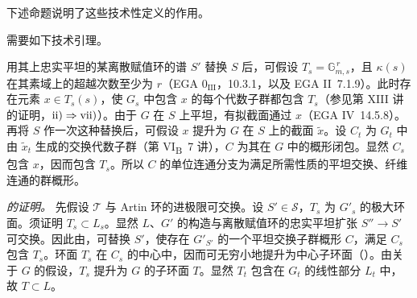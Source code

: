 下述命题说明了这些技术性定义的作用。


需要如下技术引理。


用其上忠实平坦的某离散赋值环的谱 \(S'\) 替换 \(S\) 后，可假设 \(T_s=\mathbb G_{m,s}^{\,r}\)，且 \(\kappa(s)\) 在其素域上的超越次数至少为 \(r\)（EGA \(0_{\mathrm{III}}\)，10.3.1，以及 EGA II~7.1.9）。此时存在元素 \(x\in T_s(s)\)，使 \(G_s\) 中包含 \(x\) 的每个代数子群都包含 \(T_s\)（参见第 XIII 讲  的证明，\(\textup{ii)}\Rightarrow\textup{vii)}\)）。由于 \(G\) 在 \(S\) 上平坦，有拟截面通过 \(x\)（EGA IV~14.5.8）。再将 \(S\) 作一次这种替换后，可假设 \(x\) 提升为 \(G\) 在 \(S\) 上的截面 \(\widetilde x\)。设 \(C_t\) 为 \(G_t\) 中由 \(\widetilde x_t\) 生成的交换代数子群（第 VI\textsubscript{B}~7 讲），\(C\) 为其在 \(G\) 中的概形闭包。显然 \(C_s\) 包含 \(x\)，因而包含 \(T_s\)。所以 \(C\) 的单位连通分支为满足所需性质的平坦交换、纤维连通的群概形。

\medskip\noindent\textit{ 的证明。}
先假设 \(\mathcal T\) 与 Artin 环的进极限可交换。设 \(S'\in\mathcal S\)，\(T_s\) 为 \(G'_s\) 的极大环面。须证明 \(T_s\subset L_s\)。显然 \(L\)、\(G'\) 的构造与离散赋值环的忠实平坦扩张 \(S''\to S'\) 可交换。因此由，可替换 \(S'\)，使存在 \(G'_{S'}\) 的一个平坦交换子群概形 \(C\)，满足 \(C_s\) 包含 \(T_s\)。环面 \(T_s\) 在 \(C_s\) 的中心中，因而可无穷小地提升为中心子环面（）。由关于 \(G\) 的假设，\(T_s\) 提升为 \(G\) 的子环面 \(T\)。显然 \(T_t\) 包含在 \(G_t\) 的线性部分 \(L_t\) 中，故 \(T\subset L\)。

